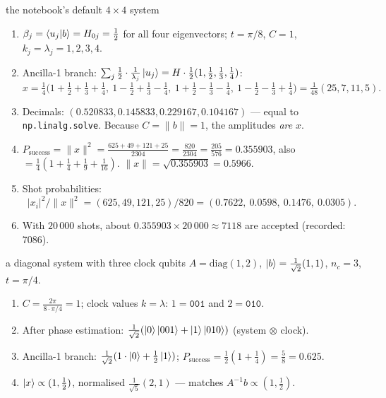 \documentclass[11pt,a4paper,openany]{book}
\newcounter{wex}[chapter]
\newenvironment{steps}{\begin{enumerate}[label=\textbf{Step \arabic*.}, leftmargin=4.2em, itemsep=2pt]}{\end{enumerate}}
\begin{document}
\begin{wexample}{the notebook's default $4\times4$ system}
\begin{steps}
\item $\beta_j = \braket{u_j|b} = H_{0j} = \frac12$ for all four eigenvectors; $t = \pi/8$, $C = 1$, $k_j = \lambda_j = 1, 2, 3, 4$.
\item Ancilla-1 branch: $\sum_j\frac12\cdot\frac{1}{\lambda_j}\ket{u_j} = H\cdot\frac12(1, \frac12, \frac13, \frac14)$:
      \[ x = \tfrac14\big(1 + \tfrac12 + \tfrac13 + \tfrac14,\ 1 - \tfrac12 + \tfrac13 - \tfrac14,\ 1 + \tfrac12 - \tfrac13 - \tfrac14,\ 1 - \tfrac12 - \tfrac13 + \tfrac14\big)
         = \tfrac{1}{48}(25, 7, 11, 5). \]
\item Decimals: $(0.520833, 0.145833, 0.229167, 0.104167)$ --- equal to \texttt{np.linalg.solve}. Because $C = \|b\| = 1$, the amplitudes \emph{are} $x$.
\item $P_{\text{success}} = \|x\|^2 = \frac{625 + 49 + 121 + 25}{2304} = \frac{820}{2304} = \frac{205}{576} = 0.355903$, also $= \frac14(1 + \frac14 + \frac19 + \frac1{16})$.
      $\|x\| = \sqrt{0.355903} = 0.5966$.
\item Shot probabilities: \[ |x_i|^2/\|x\|^2 = (625, 49, 121, 25)/820 = (0.7622,\ 0.0598,\ 0.1476,\ 0.0305). \]
\item With $20\,000$ shots, about $0.355903\times20\,000 \approx 7118$ are accepted (recorded: 7086).
\end{steps}
\end{wexample}

\begin{wexample}{a diagonal system with three clock qubits}
$A = \mathrm{diag}(1, 2)$, $\ket b = \frac{1}{\sqrt2}(1, 1)$, $n_c = 3$, $t = \pi/4$.
\begin{steps}
\item $C = \frac{2\pi}{8\cdot\pi/4} = 1$; clock values $k = \lambda$: $1 = \texttt{001}$ and $2 = \texttt{010}$.
\item After phase estimation: $\frac{1}{\sqrt2}(\ket0\ket{001} + \ket1\ket{010})$ (system $\otimes$ clock).
\item Ancilla-1 branch: $\frac{1}{\sqrt2}(1\cdot\ket0 + \frac12\ket1)$; $P_{\text{success}} = \frac12(1 + \frac14) = \frac58 = 0.625$.
\item $\ket x \propto (1, \frac12)$, normalised $\frac{1}{\sqrt5}(2, 1)$ --- matches $A^{-1}b \propto (1, \frac12)$.
\end{steps}
\end{wexample}
\end{document}
